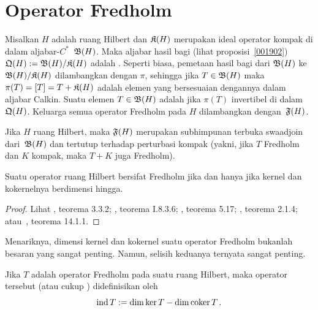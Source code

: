 \section{Operator Fredholm}
\begin{defn} Misalkan $H$ adalah ruang Hilbert dan $\mathfrak{K}(H)$ merupakan ideal operator kompak di dalam
aljabar-$C^*$~$\mathfrak{B}(H)$. Maka aljabar hasil bagi (lihat proposisi~\ref{001902})
$\mathfrak{Q}(H) := \mathfrak{B}(H)/\mathfrak{K}(H)$ adalah
. Seperti biasa, pemetaan hasil bagi dari $\mathfrak{B}(H)$ ke $\mathfrak{B}(H)/\mathfrak{K}(H)$
dilambangkan dengan $\pi$, sehingga jika $T \in \mathfrak{B}(H)$ maka $\pi(T) = [T] = T + \mathfrak{K}(H)$ adalah
elemen yang bersesuaian dengannya dalam aljabar Calkin. Suatu elemen $T \in \mathfrak{B}(H)$ adalah
 jika $\pi(T)$ invertibel di dalam~$\mathfrak{Q}(H)$. Keluarga
semua operator Fredholm pada $H$ dilambangkan dengan~$\mathfrak{F}(H)$.
\end{defn}

\begin{prop} Jika $H$ ruang Hilbert, maka $\mathfrak{F}(H)$ merupakan subhimpunan terbuka swaadjoin
dari~$\mathfrak{B}(H)$ dan tertutup terhadap
perturbasi kompak (yakni, jika $T$ Fredholm dan $K$ kompak, maka $T + K$ juga Fredholm).
\end{prop}

\begin{thm}\label{004352}
Suatu operator ruang Hilbert bersifat Fredholm jika dan hanya jika kernel dan kokernelnya
berdimensi hingga.
\end{thm}

\begin{proof} Lihat \cite{Arveson:2002}, teorema 3.3.2; \cite{Blackadar:2006}, teorema I.8.3.6;
\cite{Douglas:1972}, teorema 5.17; \cite{HigsonR:2000}, teorema 2.1.4;
atau~\cite{Wegge-Olsen:1993}, teorema 14.1.1. \ns
\end{proof}

Menariknya, dimensi kernel dan kokernel suatu operator Fredholm bukanlah besaran yang
sangat penting. Namun, selisih keduanya ternyata sangat penting.

\begin{defn} Jika $T$ adalah operator Fredholm pada suatu ruang Hilbert, maka
 operator tersebut (atau cukup ) didefinisikan oleh
   \[ \operatorname{ind} T := \dim\ker T - \dim\operatorname{coker} T\,. \]
\end{defn}

